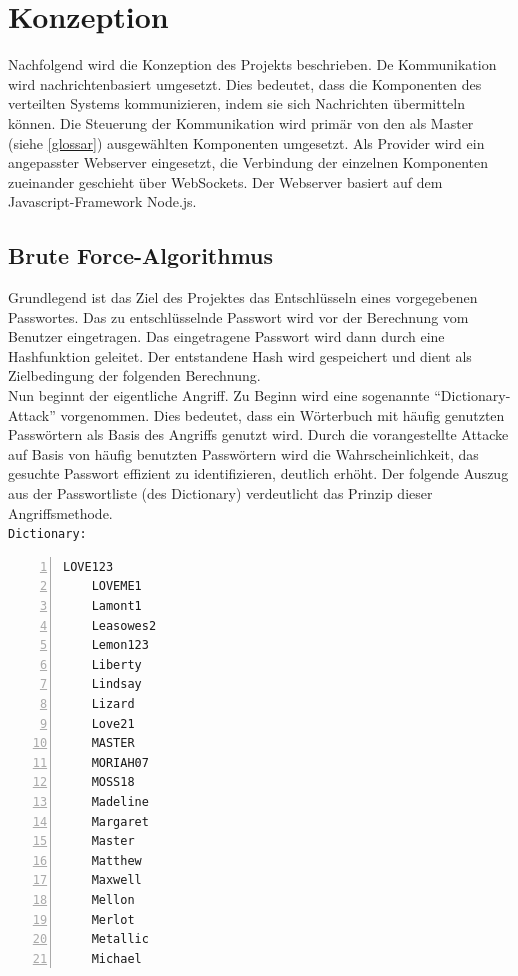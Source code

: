 \chapter{Konzeption}
\label{Konzeption}
Nachfolgend wird die Konzeption des Projekts beschrieben. 
De Kommunikation wird nachrichtenbasiert umgesetzt. Dies bedeutet, dass die Komponenten des verteilten Systems kommunizieren, indem sie sich Nachrichten übermitteln können. Die Steuerung der Kommunikation wird primär von den als Master 
(siehe \ref{glossar}) ausgewählten Komponenten umgesetzt. Als Provider wird ein angepasster Webserver eingesetzt, die Verbindung der einzelnen Komponenten zueinander geschieht über WebSockets. Der Webserver basiert auf dem Javascript-Framework Node.js. \\


\section{Brute Force-Algorithmus}
\label{ideeBruteForce}
Grundlegend ist das Ziel des Projektes das Entschlüsseln eines vorgegebenen Passwortes. Das zu entschlüsselnde Passwort wird vor der Berechnung vom Benutzer eingetragen. Das eingetragene Passwort wird dann durch eine Hashfunktion geleitet. Der entstandene Hash wird gespeichert und dient als Zielbedingung der folgenden Berechnung. \\
Nun beginnt der eigentliche Angriff. Zu Beginn wird eine sogenannte \enquote{Dictionary-Attack} vorgenommen. Dies bedeutet, dass ein Wörterbuch mit häufig genutzten Passwörtern als Basis des Angriffs genutzt wird. Durch die vorangestellte Attacke auf Basis von häufig benutzten Passwörtern wird die Wahrscheinlichkeit, das gesuchte Passwort effizient zu identifizieren, deutlich erhöht. Der folgende Auszug aus der Passwortliste (des Dictionary) verdeutlicht das Prinzip dieser Angriffsmethode. \\
\texttt{Dictionary:}
\begin{lstlisting}[basicstyle=\ttfamily,numbers=left,numberstyle=\footnotesize\ttfamily,backgroundcolor=\color{sourcegray}]
	LOVE123
	LOVEME1
	Lamont1
	Leasowes2
	Lemon123
	Liberty
	Lindsay
	Lizard
	Love21
	MASTER
	MORIAH07
	MOSS18
	Madeline
	Margaret
	Master
	Matthew
	Maxwell
	Mellon
	Merlot
	Metallic
	Michael
\end{lstlisting}



